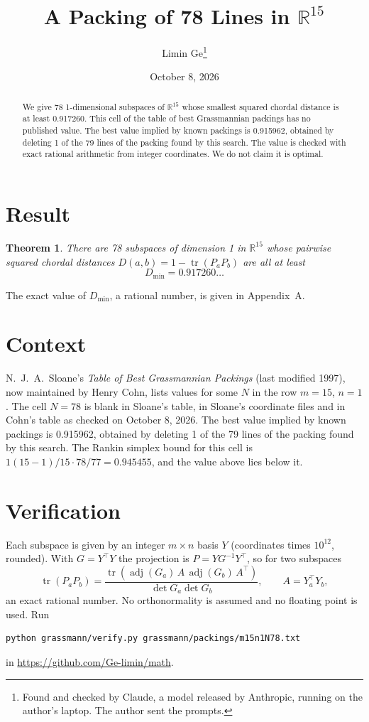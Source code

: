 \documentclass[11pt,a4paper]{article}
\title{A Packing of 78 Lines in $\mathbb{R}^{15}$}
\author{Limin Ge\thanks{Found and checked by Claude, a model released by Anthropic, running on the author's laptop. The author sent the prompts.}}
\date{October 8, 2026}
\newtheorem*{theorem}{Theorem}
\begin{document}
\maketitle
\begin{abstract}
We give 78 1-dimensional subspaces of $\mathbb{R}^{15}$ whose smallest squared chordal distance is at least 0.917260. This cell of the table of best Grassmannian packings has no published value. The best value implied by known packings is 0.915962, obtained by deleting 1 of the 79 lines of the packing found by this search. The value is checked with exact rational arithmetic from integer coordinates. We do not claim it is optimal.
\end{abstract}

\section{Result}
\begin{theorem}
There are 78 subspaces of dimension 1 in $\mathbb{R}^{15}$ whose pairwise squared chordal distances $D(a,b) = 1 - \operatorname{tr}(P_aP_b)$ are all at least
\[ D_{\min} = 0.917260\ldots \]
\end{theorem}
The exact value of $D_{\min}$, a rational number, is given in Appendix~A.


\section{Context}
N.~J.~A.~Sloane's \emph{Table of Best Grassmannian Packings} (last modified 1997), now maintained by Henry Cohn, lists values for some $N$ in the row $m=15$, $n=1$. The cell $N=78$ is blank in Sloane's table, in Sloane's coordinate files and in Cohn's table as checked on October 8, 2026. The best value implied by known packings is 0.915962, obtained by deleting 1 of the 79 lines of the packing found by this search. The Rankin simplex bound for this cell is $1(15-1)/15\cdot 78/77 = 0.945455$, and the value above lies below it.


\section{Verification}
Each subspace is given by an integer $m\times n$ basis $Y$ (coordinates times $10^{12}$, rounded). With $G=Y^\top Y$ the projection is $P=YG^{-1}Y^\top$, so for two subspaces
\[ \operatorname{tr}(P_aP_b)=\frac{\operatorname{tr}(\operatorname{adj}(G_a)\,A\,\operatorname{adj}(G_b)\,A^\top)}{\det G_a\det G_b},\qquad A=Y_a^\top Y_b, \]
an exact rational number. No orthonormality is assumed and no floating point is used. Run
\begin{verbatim}
python grassmann/verify.py grassmann/packings/m15n1N78.txt
\end{verbatim}
in \url{https://github.com/Ge-limin/math}.
\end{document}
